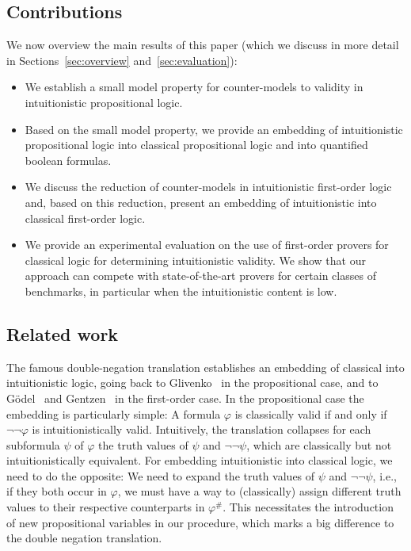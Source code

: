 \documentclass[runningheads]{llncs}
\begin{document}
\subsection*{Contributions} 
We now overview the main results of this paper (which we discuss in more detail in Sections~\ref{sec:overview} and~\ref{sec:evaluation}):
\begin{itemize}
	\item We establish a small model property for counter-models to validity in intuitionistic propositional logic.
	\item Based on the small model property, we provide an embedding of intuitionistic propositional logic into classical propositional logic and into quantified boolean formulas.
	\item We discuss the reduction of counter-models in intuitionistic first-order logic and, based on this reduction, present an embedding of intuitionistic into classical first-order logic.
	\item We provide an experimental evaluation on the use of first-order provers for classical logic for determining intuitionistic validity.
 We show that our approach can compete with state-of-the-art provers for certain classes of benchmarks, in particular when the intuitionistic content is low.
\end{itemize}

\subsection*{Related work}
The famous double-negation translation establishes
an embedding of classical into intuitionistic logic, going back to Glivenko~\cite{glivenko1929quelques} in the propositional case, and to G\"odel~\cite{godel1933intuitionistischen} and Gentzen~\cite{gentzen1936widerspruchsfreiheit} in the first-order case.
In the propositional case the embedding is particularly simple: 
A formula $\varphi$ is classically valid if and only if $\neg\neg\varphi$ is intuitionistically valid. 
Intuitively, the translation collapses for each subformula $\psi$ of $\varphi$ the truth values of $\psi$ and $\neg\neg\psi$, which are classically but not intuitionistically equivalent.
For embedding intuitionistic into classical logic, we need to do the opposite:
We need to expand the truth values of $\psi$ and $\neg\neg\psi$, i.e., if they both occur in $\varphi$, we must have a way to (classically) assign different truth values to their respective counterparts in $\varphi^\#$.
This necessitates the introduction of new propositional variables in our procedure, which marks a big difference to the double negation translation.
\end{document}
